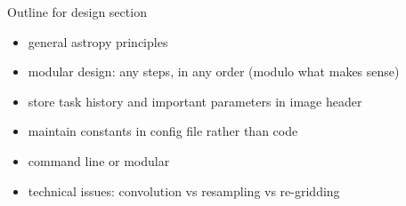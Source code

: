Outline for design section

\begin{itemize}
\item general astropy principles
\item modular design: any steps, in any order (modulo what makes sense)
\item store task history and important parameters in image header
\item maintain constants in config file rather than code
\item command line or modular
\item technical issues: convolution vs resampling vs re-gridding
\end{itemize}
